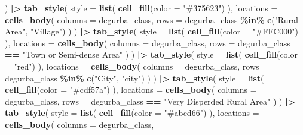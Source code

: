 \documentclass[
]{article}
\newenvironment{Shaded}{\begin{snugshade}}{\end{snugshade}}
\newcommand{\AttributeTok}[1]{\textcolor[rgb]{0.13,0.29,0.53}{#1}}
\newcommand{\FunctionTok}[1]{\textcolor[rgb]{0.13,0.29,0.53}{\textbf{#1}}}
\newcommand{\NormalTok}[1]{#1}
\newcommand{\SpecialCharTok}[1]{\textcolor[rgb]{0.81,0.36,0.00}{\textbf{#1}}}
\newcommand{\StringTok}[1]{\textcolor[rgb]{0.31,0.60,0.02}{#1}}
\newenvironment{UNFPAShadedBox}{%
\begin{tcolorbox}[sharp corners, enhanced, colback=white, boxrule=0pt, borderline west={2pt}{0pt}{orange}]%
}{\end{tcolorbox}}
\newenvironment{Highlighting}{\begin{UNFPAShadedBox}}{\end{UNFPAShadedBox}}
\begin{document}
\begin{Shaded}
\begin{Highlighting}[]
\NormalTok{  ) }\SpecialCharTok{|\textgreater{}}
  \FunctionTok{tab\_style}\NormalTok{(}
    \AttributeTok{style =} \FunctionTok{list}\NormalTok{(}
      \FunctionTok{cell\_fill}\NormalTok{(}\AttributeTok{color =} \StringTok{"\#375623"}\NormalTok{) }
\NormalTok{      ),}
    \AttributeTok{locations =} \FunctionTok{cells\_body}\NormalTok{(}
      \AttributeTok{columns =}\NormalTok{ degurba\_class,}
      \AttributeTok{rows =}\NormalTok{ degurba\_class }\SpecialCharTok{\%in\%} \FunctionTok{c}\NormalTok{(}\StringTok{"Rural Area"}\NormalTok{, }\StringTok{"Village"}\NormalTok{)}
\NormalTok{      )}
\NormalTok{  ) }\SpecialCharTok{|\textgreater{}}
  \FunctionTok{tab\_style}\NormalTok{(}
    \AttributeTok{style =} \FunctionTok{list}\NormalTok{(}
      \FunctionTok{cell\_fill}\NormalTok{(}\AttributeTok{color =} \StringTok{"\#FFC000"}\NormalTok{) }
\NormalTok{      ),}
    \AttributeTok{locations =} \FunctionTok{cells\_body}\NormalTok{(}
      \AttributeTok{columns =}\NormalTok{ degurba\_class,}
      \AttributeTok{rows =}\NormalTok{ degurba\_class }\SpecialCharTok{==} \StringTok{"Town or Semi{-}dense Area"}
\NormalTok{    )}
\NormalTok{  ) }\SpecialCharTok{|\textgreater{}}
  \FunctionTok{tab\_style}\NormalTok{(}
    \AttributeTok{style =} \FunctionTok{list}\NormalTok{(}
      \FunctionTok{cell\_fill}\NormalTok{(}\AttributeTok{color =} \StringTok{"red"}\NormalTok{)}
\NormalTok{      ),}
    \AttributeTok{locations =} \FunctionTok{cells\_body}\NormalTok{(}
      \AttributeTok{columns =}\NormalTok{ degurba\_class,}
      \AttributeTok{rows =}\NormalTok{ degurba\_class }\SpecialCharTok{\%in\%} \FunctionTok{c}\NormalTok{(}\StringTok{"City"}\NormalTok{, }\StringTok{"city"}\NormalTok{)}
\NormalTok{    )}
\NormalTok{  ) }\SpecialCharTok{|\textgreater{}}
  \FunctionTok{tab\_style}\NormalTok{(}
    \AttributeTok{style =} \FunctionTok{list}\NormalTok{(}
      \FunctionTok{cell\_fill}\NormalTok{(}\AttributeTok{color =} \StringTok{"\#cdf57a"}\NormalTok{)}
\NormalTok{      ),}
    \AttributeTok{locations =} \FunctionTok{cells\_body}\NormalTok{(}
      \AttributeTok{columns =}\NormalTok{ degurba\_class,}
      \AttributeTok{rows =}\NormalTok{ degurba\_class }\SpecialCharTok{==} \StringTok{"Very Disperded Rural Area"}
\NormalTok{    )}
\NormalTok{  ) }\SpecialCharTok{|\textgreater{}}
  \FunctionTok{tab\_style}\NormalTok{(}
    \AttributeTok{style =} \FunctionTok{list}\NormalTok{(}
      \FunctionTok{cell\_fill}\NormalTok{(}\AttributeTok{color =} \StringTok{"\#abcd66"}\NormalTok{)}
\NormalTok{      ),}
    \AttributeTok{locations =} \FunctionTok{cells\_body}\NormalTok{(}
      \AttributeTok{columns =}\NormalTok{ degurba\_class,}

\end{Highlighting}
\end{Shaded}
\end{document}
